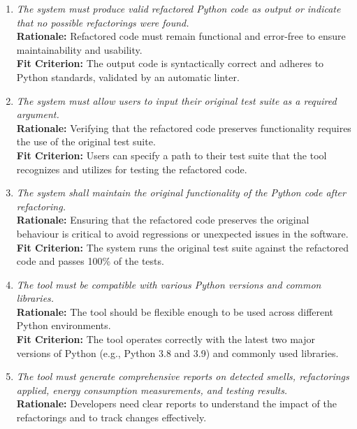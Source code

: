 \documentclass[12pt]{article}
\begin{document}
\begin{enumerate}[label=FR \arabic*., wide=0pt, leftmargin=*]
    {\bf Fit Criterion:} The algorithm evaluates multiple refactoring options and selects the one that results in the lowest energy consumption for the given code smell.
    \item \emph{The system must produce valid refactored Python code as output or indicate that no possible refactorings were found.}\\[2mm]
    {\bf Rationale:} Refactored code must remain functional and error-free to ensure maintainability and usability.\\
    {\bf Fit Criterion:} The output code is syntactically correct and adheres to Python standards, validated by an automatic linter.
    \item \emph{The system must allow users to input their original test suite as a required argument.}\\[2mm]
    {\bf Rationale:} Verifying that the refactored code preserves functionality requires the use of the original test suite.\\
    {\bf Fit Criterion:} Users can specify a path to their test suite that the tool recognizes and utilizes for testing the refactored code.
    \item \emph{The system shall maintain the original functionality of the Python code after refactoring.}\\[2mm]
    {\bf Rationale:} Ensuring that the refactored code preserves the original behaviour is critical to avoid regressions or unexpected issues in the software.\\
    {\bf Fit Criterion:} The system runs the original test suite against the refactored code and passes 100\% of the tests.
    \item \emph{The tool must be compatible with various Python versions and common libraries.}\\[2mm]
    {\bf Rationale:} The tool should be flexible enough to be used across different Python environments.\\
    {\bf Fit Criterion:} The tool operates correctly with the latest two major versions of Python (e.g., Python 3.8 and 3.9) and commonly used libraries.
    \item \emph{The tool must generate comprehensive reports on detected smells, refactorings applied, energy consumption measurements, and testing results.}\\[2mm]
    {\bf Rationale:} Developers need clear reports to understand the impact of the refactorings and to track changes effectively.\\

\end{enumerate}
\end{document}
